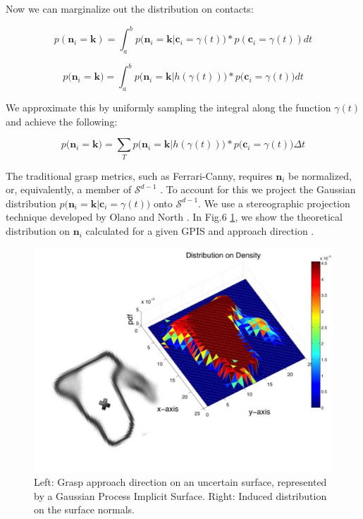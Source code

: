 \documentclass[letterpaper, 10 pt, conference]{ieeeconf}  %
\begin{document}
Now we can marginalize out the distribution on contacts:

\begin{equation}
p(\textbf{n}_i = \textbf{k}) = \int_a^b  p \big(\textbf{n}_i = \textbf{k} | \textbf{c}_i = \gamma(t) \big)*p(\textbf{c}_i = \gamma(t)) dt
\end{equation}

\begin{equation}
p\big(\textbf{n}_i = \textbf{k}\big) = \int_a^b  p \big(\textbf{n}_i = \textbf{k} | h(\gamma(t))\big)*p\big(\textbf{c}_i = \gamma(t)\big) dt
\end{equation}

We approximate this by uniformly sampling the integral along the function $\gamma(t)$ and achieve the following: 

\begin{equation}
p\big( \textbf{n}_i = \textbf{k} \big) = \sum_T  p \big( \textbf{n}_i = \textbf{k} | h(\gamma(t)) \big) *p\big(\textbf{c}_i = \gamma(t)\big) \Delta t
\end{equation}


The traditional grasp metrics, such as  Ferrari-Canny, requires $\textbf{n}_i$ be normalized, or, equivalently, a member of $\mathcal{S}^{d-1}$ \cite{ferrari1992}. To account for this we project the Gaussian distribution $p \big(\textbf{n}_i = \textbf{k} |\textbf{c}_i = \gamma(t) \big)$  onto $\mathcal{S}^{d-1}$. We use a stereographic projection technique developed by Olano and North \cite{olano1997normal}. In Fig.6
\ref{fig:GraspSurfaceNormals}, we show the theoretical distribution on $\textbf{n}_i$ calculated for a given GPIS and approach direction .

\begin{figure}[ht!]
\centering
\includegraphics[scale = 0.3]{figures/Slide05.jpg}
\caption{Left: Grasp approach direction on an uncertain surface, represented by a Gaussian Process Implicit Surface.
Right: Induced distribution on the surface normals.}
\vspace*{-10pt}
\label{fig:GraspSurfaceNormals}
\end{figure}
\end{document}
